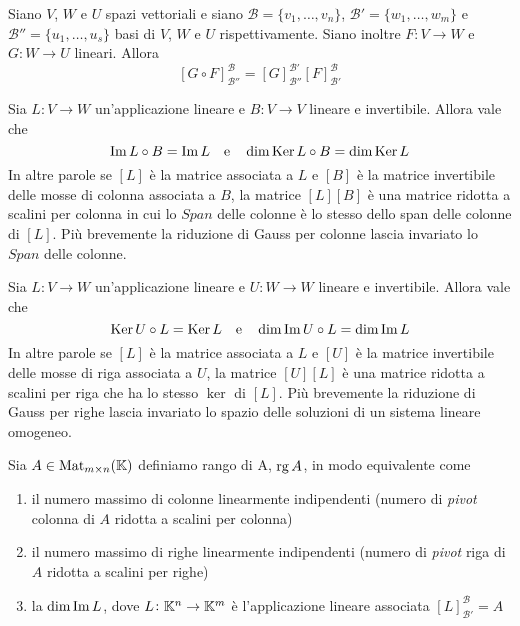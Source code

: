 \begin{thm}
	Siano $ V $, $ W $ e $ U $ spazi vettoriali e siano \linebreak $ \mathscr{B} = \{v_1, \ldots, v_n\} $, $ \mathscr{B}' = \{w_1, \ldots, w_m\} $ e $ \mathscr{B}'' = \{u_1, \ldots, u_s\} $ basi di $ V $, $ W $ e $ U $ rispettivamente. Siano inoltre $ F \colon V \to W $ e $ G \colon W \to U $ lineari. Allora \[ \left [G \circ F \right ]_{\mathscr{B}''} ^{\mathscr{B}} = \left [G \right ]_{\mathscr{B}''} ^{\mathscr{B}'} \left [F \right ]_{\mathscr{B}'} ^{\mathscr{B}} \]
\end{thm}

\begin{thm}
	Sia $ L \colon V \to W $ un'applicazione lineare e $ B \colon V \to V $ lineare e invertibile. Allora vale che \[\operatorname{Im}{L \circ B} = \operatorname{Im}{L} \quad \mathrm{e} \quad \dim{\operatorname{Ker}{L \circ B}} = \dim{\operatorname{Ker}{L}}\] In altre parole se $ \left [L \right ] $ è la matrice associata a $ L $ e $ \left [B \right ] $ è la matrice invertibile delle mosse di colonna associata a $ B $, la matrice $ \left [L \right ] \left [B \right ] $ è una matrice ridotta a scalini per colonna in cui lo $ Span $ delle colonne è lo stesso dello span delle colonne di $ \left [L \right ] $. Più brevemente la riduzione di Gauss per colonne lascia invariato lo $ Span $ delle colonne. 
\end{thm}

\begin{thm}
	Sia $ L \colon V \to W $ un'applicazione lineare e $ U \colon W \to W $ lineare e invertibile. Allora vale che \[\operatorname{Ker}{U \circ L} = \operatorname{Ker}{L} \quad \mathrm{e} \quad \dim{\operatorname{Im}{U \circ L}} = \dim{\operatorname{Im}{L}}\] In altre parole se $ \left [L \right ] $ è la matrice associata a $ L $ e $ \left [U \right ] $ è la matrice invertibile delle mosse di riga associata a $ U $, la matrice $ \left [U \right ] \left [L \right ] $ è una matrice ridotta a scalini per riga che ha lo stesso $ \ker $ di $ \left [L \right ] $. Più brevemente la riduzione di Gauss per righe lascia invariato lo spazio delle soluzioni di un sistema lineare omogeneo.
\end{thm}

\begin{definition}[rango]
	Sia $ A \in \mathrm{Mat}_{m \times n} (\mathbb{K}) $ definiamo rango di A, $ \operatorname{rg}{A} $, in modo equivalente come
	\begin{enumerate}
		\item il numero massimo di colonne linearmente indipendenti (numero di \emph{pivot} colonna di $ A $ ridotta a scalini per colonna)
		\item il numero massimo di righe linearmente indipendenti (numero di \emph{pivot} riga di $ A $ ridotta a scalini per righe)
		\item la $ \dim{\operatorname{Im}{L}} $, dove $ L \colon \mathbb{K}^n \to \mathbb{K}^m $ è l'applicazione lineare associata $ \left [L \right ]_{\mathscr{B}'} ^{\mathscr{B}} = A $
	\end{enumerate}
\end{definition}
